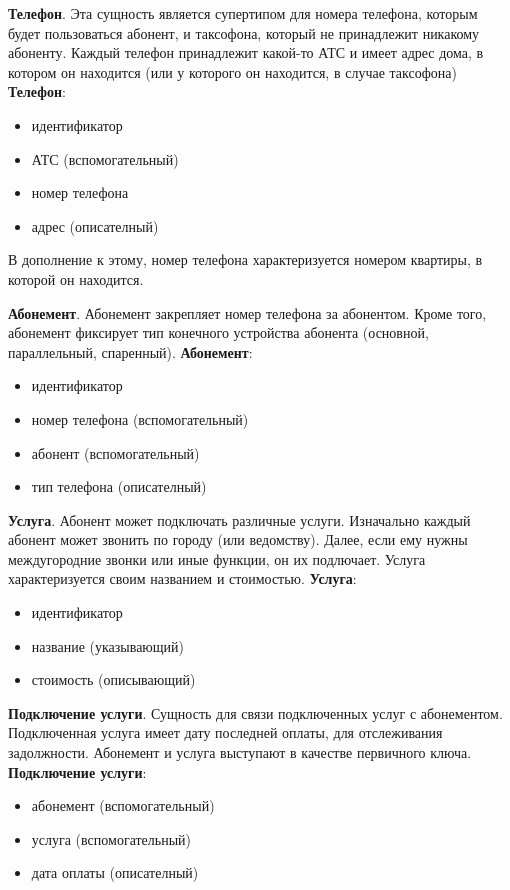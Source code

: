 \documentclass{report}
\begin{document}
\textbf{Телефон}. Эта сущность является супертипом для номера телефона, 
которым будет пользоваться абонент, и таксофона, который не принадлежит
никакому абоненту. Каждый телефон принадлежит какой-то АТС и имеет адрес дома,
в котором он находится (или у которого он находится, в случае таксофона)
\newline\textbf{Телефон}:
\begin{itemize}
    \item идентификатор
    \item АТС (вспомогательный)
    \item номер телефона
    \item адрес (описателный)
\end{itemize}
В дополнение к этому, номер телефона характеризуется 
номером квартиры, в которой он находится. 

\textbf{Абонемент}. Абонемент закрепляет номер телефона за абонентом.
Кроме того, абонемент фиксирует тип конечного 
устройства абонента (основной, параллельный, спаренный). 
\newline\textbf{Абонемент}:
\begin{itemize}
    \item идентификатор
    \item номер телефона (вспомогательный)
    \item абонент (вспомогательный)
    \item тип телефона (описателный)
\end{itemize}

\textbf{Услуга}. Абонент может подключать различные услуги. Изначально 
каждый абонент может звонить по городу (или ведомству). Далее, если 
ему нужны междугородние звонки или иные функции, он их подлючает. Услуга
характеризуется своим названием и стоимостью.
\newline\textbf{Услуга}:
\begin{itemize}
    \item идентификатор
    \item название (указывающий)
    \item стоимость (описывающий)
\end{itemize}

\textbf{Подключение услуги}. Сущность для связи подключенных услуг с 
абонементом. Подключенная услуга имеет дату последней оплаты, для отслеживания
задолжности. Абонемент и услуга выступают в качестве первичного ключа.
\newline\textbf{Подключение услуги}:
\begin{itemize}
    \item абонемент (вспомогательный)
    \item услуга (вспомогательный)
    \item дата оплаты (описателный)
\end{itemize}
\end{document}
